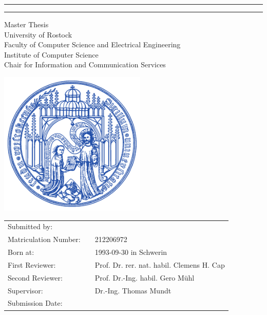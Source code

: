 \begin{titlepage}

	\begin{center}
		
		\hrule
		\vspace{0.5cm}
		\LARGE {\bfseries \thetitle}
		\vspace{0.5cm}
		\hrule
		
		\vspace{0.8cm}
		\Large {Master Thesis}\\
		\vspace{1.0cm}
		\large {University of Rostock\\
		Faculty of Computer Science and Electrical Engineering\\
		Institute of Computer Science\\
		Chair for Information and Communication Services}
		
		\vfill
		\includegraphics[width=7cm]{style/UNI-Logo.pdf}
		
	\end{center}
	
	\vfill
	\large
	\begin{tabular}{lcl}
		Submitted by: &&  \theauthor \\
		Matriculation Number: && 212206972\\
		Born at: && 1993-09-30 in Schwerin\\
		First Reviewer: && Prof. Dr. rer. nat. habil. Clemens H. Cap\\
		Second Reviewer: && Prof. Dr.-Ing. habil. Gero Mühl\\
		Supervisor: && Dr.-Ing. Thomas Mundt\\
		Submission Date: && \thedate
	\end{tabular}
	\normalsize
	
	
\end{titlepage}